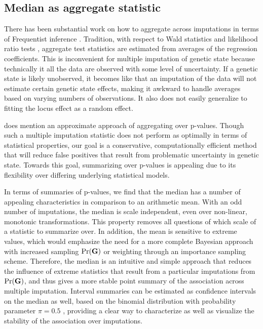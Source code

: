 \subsection{Median as aggregate statistic}
There has been substantial work on how to aggregate across imputations in terms of Frequentist inference \citep{Li1991}. Tradition, with respect to Wald statistics and likelihood ratio tests \citep{Meng1992}, aggregate test statistics are estimated from averages of the regression coefficients. This is inconvenient for multiple imputation of genetic state because technically it all the data are observed with some level of uncertainty. If a genetic state is likely unobserved, it becomes like that an imputation of the data will not estimate certain genetic state effects, making it awkward to handle averages based on varying numbers of observations. It also does not easily generalize to fitting the locus effect as a random effect.

\cite{Li1991} does mention an approximate approach of aggregating over p-values. Though such a multiple imputation statistic does not perform as optimally in terms of statistical properties, our goal is a conservative, computationally efficient method that will reduce false positives that result from problematic uncertainty in genetic state. Towards this goal, summarizing over p-values is appealing due to its flexibility over differing underlying statistical models. 

In terms of summaries of p-values, we find that the median has a number of appealing characteristics in comparison to an arithmetic mean. With an odd number of imputations, the median is scale independent, even over non-linear, monotonic transformations. This property removes all questions of which scale of a statistic to summarize over. In addition, the mean is sensitive to extreme values, which would emphasize the need for a more complete Bayesian approach with increased sampling $\text{Pr}(\mathbf{G})$ or weighting through an importance sampling scheme. Therefore, the median is an intuitive and simple approach that reduces the influence of extreme statistics that result from a particular imputations from $\text{Pr}(\mathbf{G})$, and thus gives a more stable point summary of the association across multiple imputation. Interval summaries can be estimated as confidence intervals on the median as well, based on the binomial distribution with probability parameter $\pi = 0.5$ \citep{Ott2006}, providing a clear way to characterize as well as visualize the stability of the association over imputations.

